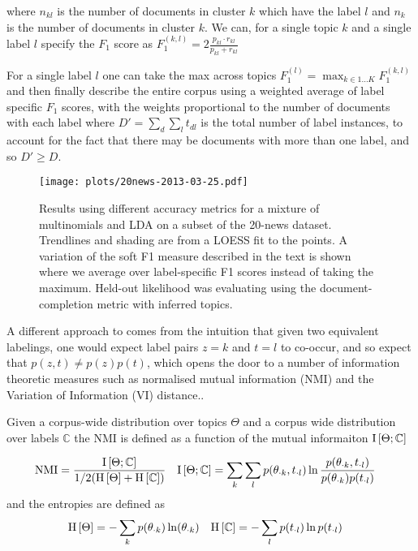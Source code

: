 where $n_{kl}$ is the number of documents in cluster $k$ which have the label $l$ and $n_k$ is the number of documents in cluster $k$. We can, for a single topic $k$ and a single label $l$ specify the $F_1$ score as $F_1^{(k,l)} = 2 \frac{p_{kl} \cdot {r_{kl}}}{p_{kl} + {r_{kl}}}$

For a single label $l$ one can take the max across topics $F_1^{(l)} = \max_{k \in 1\ldots K} F_1^{(k,l)}$ and then finally describe the entire corpus using a weighted average of label specific $F_1$ scores, with the weights proportional to the number of documents with each label where $D' = \sum_d \sum_l t_{dl}$ is the total number of label instances, to account for the fact that there may be documents with more than one label, and so $D' \geq D$.


\begin{figure}
  \centering
    \texttt{[image: plots/20news-2013-03-25.pdf]}
  \caption{Results using different accuracy metrics for a mixture of multinomials and LDA on a subset of the 20-news dataset. Trendlines and shading are from a LOESS fit to the points. A variation of the soft F1 measure described in the text is shown where we average over label-specific F1 scores instead of taking the maximum. Held-out likelihood was evaluating using the document-completion metric with inferred topics.}
  \label{fig:eval-metrics-shootout}
\end{figure}


A different approach to comes from the intuition that given two equivalent labelings, one would expect label pairs $z=k$ and $t=l$ to co-occur, and so expect that $p(z,t) \neq p(z)p(t)$, which opens the door to a number of information theoretic measures such as normalised mutual information (NMI) and the Variation of Information (VI) distance..

\newcommand{\TopDist}{\Theta}
\newcommand{\LabDist}{\mathbb{C}}
\newcommand{\NMI}{\text{NMI}}

Given a corpus-wide distribution over topics $\TopDist$ and a corpus wide distribution over labels $\LabDist$ the NMI is defined as a function of the mutual informaiton $\mut{\TopDist}{\LabDist}$

\begin{align}
\NMI & = \frac{\mut{\TopDist}{\LabDist}}{1/2(\ent{\TopDist} + \ent{\LabDist})} &
\mut{\TopDist}{\LabDist} & = \sum_k \sum_l p(\theta_{\cdot k}, t_{\cdot l}) \ln \frac{p(\theta_{\cdot k}, t_{\cdot l})}{p(\theta_{\cdot k})p(t_{\cdot l})}
\end{align}
and the entropies are defined as
\begin{align}
\ent{\TopDist} & = - \sum_k p(\theta_{\cdot k}) \ln (\theta_{\cdot k}) &
\ent{\LabDist} & = - \sum_l p(t_{\cdot l}) \ln p(t_{\cdot l})
\end{align}

